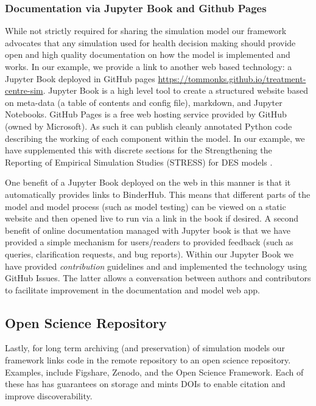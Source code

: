 \documentclass{swpaperproc}
\theoremstyle{sw}
\begin{document}
\subsubsection{Documentation via Jupyter Book and Github Pages}

While not strictly required for sharing the simulation model our framework advocates that any simulation used for health decision making should provide open and high quality documentation on how the model is implemented and works.  In our example, we provide a link to another web based technology: a Jupyter Book deployed in GitHub pages \url{https://tommonks.github.io/treatment-centre-sim}.  Jupyter Book is a high level tool to create a structured website based on meta-data (a table of contents and config file), markdown, and Jupyter Notebooks. GitHub Pages is a free web hosting service provided by GitHub (owned by Microsoft). As such it can publish cleanly annotated Python code describing the working of each component within the model.  In our example, we have supplemented this with discrete sections for the Strengthening the Reporting of Empirical Simulation Studies (STRESS) for DES models \cite{monks2019strengthening}.

One benefit of a Jupyter Book deployed on the web in this manner is that it automatically provides links to BinderHub. This means that different parts of the model and model process (such as model testing) can be viewed on a static website and then opened live to run via a link in the book if desired. A second benefit of online documentation managed with Jupyter book is that we have provided a simple mechanism for users/readers to provided feedback (such as queries, clarification requests, and bug reports).  Within our Jupyter Book we have provided \textit{contribution} guidelines and and implemented the technology using GitHub Issues.  The latter allows a conversation between authors and contributors to facilitate improvement in the documentation and model web app. 

\subsection{Open Science Repository}

Lastly, for long term archiving (and preservation) of simulation models our framework links code in the remote repository to an open science repository. Examples, include Figshare, Zenodo, and the Open Science Framework. Each of these has has guarantees on storage and mints DOIs to enable citation and improve discoverability.
\end{document}
